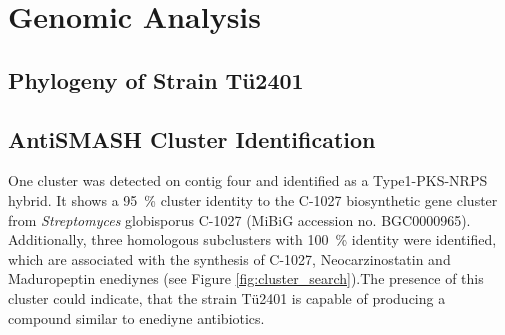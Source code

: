

\section{Genomic Analysis} %
\label{sec:genomic_analysis}

    \subsection{Phylogeny of Strain Tü2401} %
    \label{sub:phylogeny_of_strain_tue2401}


    \subsection{AntiSMASH Cluster Identification} %
    \label{sub:antismash_cluster_identification}

	 One cluster was detected on contig four and identified as a Type1-PKS-NRPS hybrid. It shows a 95~\% cluster identity to the C-1027 biosynthetic gene cluster from \textit{Streptomyces} globisporus C-1027 (MiBiG accession no. BGC0000965). Additionally, three homologous subclusters with 100~\% identity were identified, which are associated with the synthesis of C-1027, Neocarzinostatin and Maduropeptin enediynes (see Figure \ref{fig:cluster_search}).The presence of this cluster could indicate, that the strain Tü2401 is capable of producing a compound similar to enediyne antibiotics. 
	 
